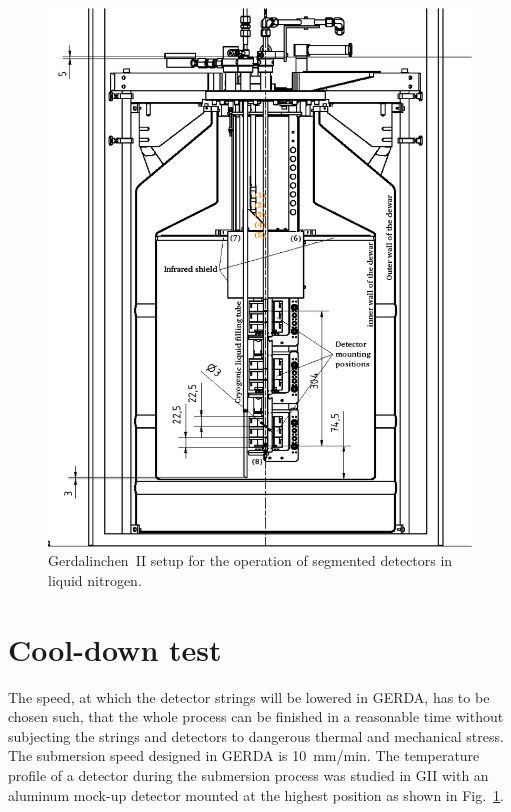 \begin{figure}[hbtp]
\centering
\includegraphics[width=\textwidth]{GIIscheme}
\caption{Gerdalinchen~II setup for the operation of segmented detectors in liquid nitrogen.}
\label{fig:ii:sch}
\end{figure}

\section{Cool-down test}
\label{sec:ii:cool}
The speed, at which the detector strings will be lowered in GERDA, has to be chosen such, that the whole process can be finished in a reasonable time without subjecting the strings and detectors to dangerous thermal and mechanical stress. The submersion speed designed in GERDA is 10~mm/min. The temperature profile of a detector during the submersion process was studied in GII with an aluminum mock-up detector mounted at the highest position as shown in Fig.~\ref{fig:ii:sch}. 

